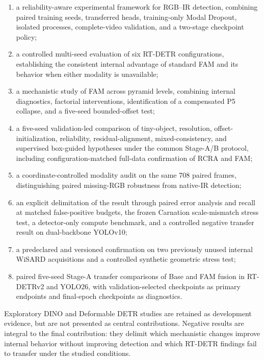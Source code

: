 \begin{enumerate}[label=\arabic*.]
  \item a reliability-aware experimental framework for RGB--IR detection,
        combining paired training seeds, transferred heads, training-only
        Modal Dropout, isolated processes, complete-video validation, and a
        two-stage checkpoint policy;
  \item a controlled multi-seed evaluation of six RT-DETR configurations,
        establishing the consistent internal advantage of standard FAM and its
        behavior when either modality is unavailable;
  \item a mechanistic study of FAM across pyramid levels, combining internal
        diagnostics, factorial interventions, identification of a compensated
        P5 collapse, and a five-seed bounded-offset test;
  \item a five-seed validation-led comparison of tiny-object, resolution,
        offset-initialization, reliability, residual-alignment,
        mixed-consistency, and supervised box-guided hypotheses under the
        common Stage-A/B protocol, including
        configuration-matched full-data confirmation of RCRA and FAM;
  \item a coordinate-controlled modality audit on the same 708 paired frames,
        distinguishing paired missing-RGB robustness from native-IR detection;
  \item an explicit delimitation of the result through paired error analysis
        and recall at matched false-positive budgets,
        the frozen Carnation scale-mismatch stress test, a detector-only
        compute benchmark, and a controlled negative transfer result on
        dual-backbone YOLOv10;
  \item a predeclared and versioned confirmation on two previously unused
        internal WiSARD acquisitions and a controlled synthetic geometric
        stress test;
  \item paired five-seed Stage-A transfer comparisons of Base and FAM
        fusion in RT-DETRv2 and YOLO26, with validation-selected checkpoints
        as primary endpoints and final-epoch checkpoints as diagnostics.
\end{enumerate}

Exploratory DINO and Deformable DETR studies are retained as development
evidence, but are not presented as central contributions. Negative results are
integral to the final contribution: they delimit which mechanistic changes
improve internal behavior without improving detection and which RT-DETR
findings fail to transfer under the studied conditions.

